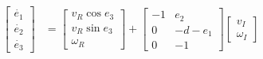           \begin{align}
               \begin{bmatrix}
                    \dot{e_1} \\
                    \dot{e_2} \\
                    \dot{e_3}
                    \end{bmatrix} &= \begin{bmatrix}
                    v_R \cos e_3 \\
                    v_R \sin e_3 \\
                    \omega_R
                    \end{bmatrix} + \begin{bmatrix}
                    -1 & e_2 \\
                    0 & -d - e_1 \\
                    0 & -1
                    \end{bmatrix} \begin{bmatrix}
                    v_I \\
                    \omega_I
               \end{bmatrix}  
               \label{c6_e2}             
          \end{align}
